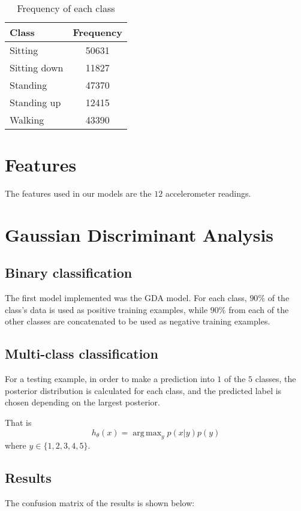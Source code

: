 \documentclass[a4paper, 11pt]{article}
\DeclareMathOperator{\argmax}{arg\,max}
\begin{document}
\begin{table}[!h]
  \centering
  \caption{Frequency of each class}
  \begin{tabular}[]{|l|c|} \hline
    \bf {Class} & \bf {Frequency} \\ \hline
    Sitting & 50631 \\ \hline
    Sitting down & 11827 \\ \hline
    Standing & 47370 \\ \hline
    Standing up & 12415 \\ \hline
    Walking & 43390 \\ \hline
  \end{tabular}
\end{table}


\section{Features}
The features used in our models are the $12$ accelerometer readings. 

\section{Gaussian Discriminant Analysis}
\subsection{Binary classification}
The first model implemented was the GDA model. For each class,
$90\%$ of the class's data is used as positive training examples,
while $90\%$ from each of the other classes are concatenated 
to be used as negative training examples.
\subsection{Multi-class classification}
For a testing example, in order to make a prediction into 
$1$ of the $5$ classes, the posterior distribution is calculated for
each class, and the predicted label is chosen depending on the largest
posterior.

That is
\begin{equation*}
  h_\theta(x) = \argmax_y p(x|y)p(y)
\end{equation*} where $y \in \lbrace 1,2,3,4,5 \rbrace$.

\subsection{Results}
The confusion matrix of the results is shown below:
\end{document}
